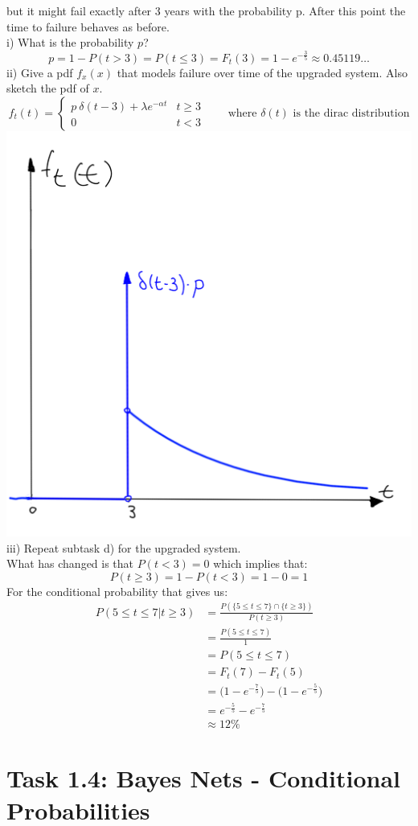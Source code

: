 \documentclass[a4paper,footsepline]{scrartcl}
\begin{document}
	but it might fail exactly after 3 years with the probability p. After this point the time
	to failure behaves as before.\\
	i) What is the probability $p$?\\
	\[ p = 1 - P(t > 3) = P(t \leq 3) = F_t(3) = 1 - e^{-\frac{3}{5}} \approx 0.45119 \dots \]
	ii) Give a pdf $f_ x(x)$ that models failure over time of the upgraded system. Also sketch
	the pdf of $x$.\\
	\[f_t(t) = \begin{cases} 
	p\ \delta(t-3) + \lambda e^{-\alpha t} & t \geq 3\\
	0 & t < 3
	\end{cases} \qquad \text{where } \delta(t) \text{ is the dirac distribution} \]
	\includegraphics[width=\textwidth]{sketch2.png}
	iii) Repeat subtask d) for the upgraded system.\vspace{0.2cm}\\
	What has changed is that $P(t < 3)=0$ which implies that:\\ 
	\[P(t \geq 3) = 1-P(t < 3) = 1-0 =1\]
	For the conditional probability that gives us:
	\begin{align*}
	P(5 \leq t \leq 7 | t \geq 3) &= \frac{P(\{5 \leq t \leq 7\} \cap \{t \geq 3\} ) }{P(t \geq 3)}\\
	&= \frac{P(5 \leq t \leq 7)}{1}\\
	&= P(5 \leq t \leq 7)\\
	&= F_t(7) - F_t(5)\\
	&=\big(1-e^{-\frac{7}{5}}\big) - \big(1-e^{-\frac{5}{5}}\big)\\
	&= e^{-\frac{5}{5}}-e^{-\frac{7}{5}}\\
	&\approx 12\%
	\end{align*}
	\section*{Task 1.4: Bayes Nets - Conditional Probabilities}
\end{document}
